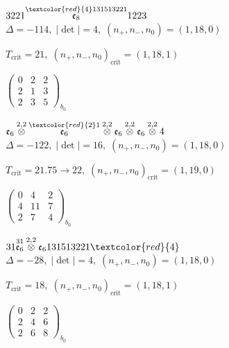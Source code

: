 \documentclass[10pt]{article}
\begin{document}
$3221\overset{\textcolor{red}{4}131513221}{\mathfrak{e}_8}1223$ \quad $\Delta=-114,\; |\det|=4,\; (n_+,n_-,n_0)=(1,18,0)$

\hspace{1em}$T_{\text{crit}}=21,\; (n_+,n_-,n_0)_{\text{crit}}=(1,18,1)$

\hspace{2em}$\left(\begin{smallmatrix}0 & 2 & 2 \\ 2 & 1 & 3 \\ 2 & 3 & 5\end{smallmatrix}\right)_{\!b_0}$

\smallskip

$\mathfrak{e}_6\overset{2,2}{\otimes}\overset{\textcolor{red}{2}1}{\mathfrak{e}_6}\overset{2,2}{\otimes}\mathfrak{e}_6\overset{2,2}{\otimes}\mathfrak{e}_6\overset{2,2}{\otimes}4$ \quad $\Delta=-122,\; |\det|=16,\; (n_+,n_-,n_0)=(1,18,0)$

\hspace{1em}$T_{\text{crit}}=21.75 \to 22,\; (n_+,n_-,n_0)_{\text{crit}}=(1,19,0)$

\hspace{2em}$\left(\begin{smallmatrix}0 & 4 & 2 \\ 4 & 11 & 7 \\ 2 & 7 & 4\end{smallmatrix}\right)_{\!b_0}$

\smallskip

$31\overset{31}{\mathfrak{e}_6}\overset{2,2}{\otimes}\mathfrak{e}_6131513221\textcolor{red}{4}$ \quad $\Delta=-28,\; |\det|=4,\; (n_+,n_-,n_0)=(1,18,0)$

\hspace{1em}$T_{\text{crit}}=18,\; (n_+,n_-,n_0)_{\text{crit}}=(1,18,1)$

\hspace{2em}$\left(\begin{smallmatrix}0 & 2 & 2 \\ 2 & 4 & 6 \\ 2 & 6 & 8\end{smallmatrix}\right)_{\!b_0}$

\smallskip
\end{document}
